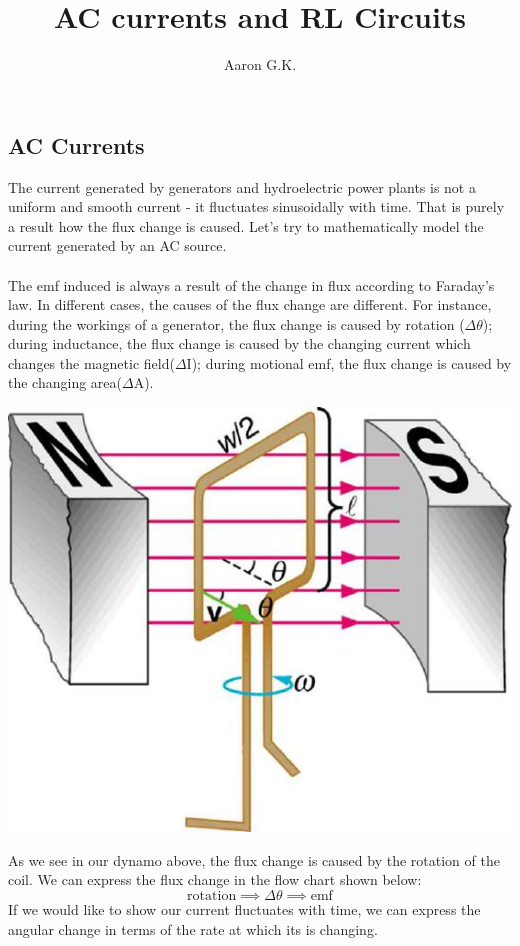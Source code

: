 \documentclass[9pt]{article}
\title{AC currents and RL Circuits}
\author{Aaron G.K.}
\begin{document}
	\maketitle
	\subsection*{AC Currents}
	The current generated by generators and hydroelectric power plants is not a uniform and smooth current - it fluctuates sinusoidally with time. That is purely a result how the flux change is caused. Let's try to mathematically model the current generated by an AC source. \\ \\
	The emf induced is always a result of the change in flux according to Faraday's law. In different cases, the causes of the flux change are different. For instance, during the workings of a generator, the flux change is caused by rotation ($\Delta\theta$); during inductance, the flux change is caused by the changing current which changes the magnetic field($\Delta$I); during motional emf, the flux change is caused by the changing area($\Delta$A).
	\begin{center}
		\includegraphics[scale=0.3]{dyn}
	\end{center}
	As we see in our dynamo above, the flux change is caused by the rotation of the coil. We can express the flux change in the flow chart shown below:
	$$\text{rotation}\implies\Delta\theta\implies\text{emf}$$
	If we would like to show our current fluctuates with time, we can express the angular change  in terms of the rate at which its is changing.
\end{document}
